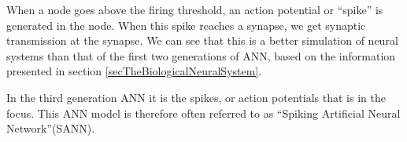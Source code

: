 When a node goes above the firing threshold, an action potential or ``spike'' is generated in the node. 
When this spike reaches a synapse, we get synaptic transmission at the synapse.
We can see that this is a better simulation of neural systems than that of the first two generations of ANN, based on the information presented in section \ref{secTheBiologicalNeuralSystem}.

In the third generation ANN it is the spikes, or action potentials that is in the focus.
This ANN model is therefore often referred to as ``Spiking Artificial Neural Network''(SANN). %







